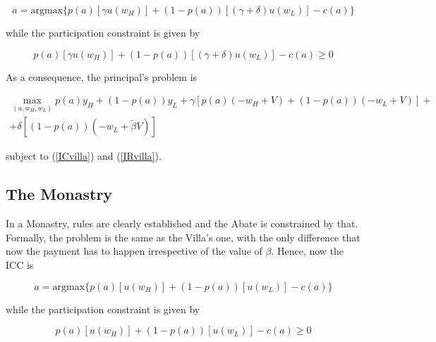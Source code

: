 \documentclass[12pt,a4paper]{article}
\begin{document}
\begin{equation}\label{ICvilla}
a= \text{argmax} \lbrace p\left(a \right)\left[\gamma u \left( w_{H}\right)\right]+\left( 1-p\left( a \right)\right)\left[\left(\gamma+\delta\right)u\left(w_{L}\right)\right]-c\left(a\right)   \rbrace
\end{equation}

while the participation constraint is given by

\begin{equation}\label{IRvilla}
p\left( a \right)\left[\gamma u\left(w_{H}\right)\right]+\left(1-p\left( a \right)\right)\left[\left(\gamma+\delta\right)u\left(w_{L}\right)\right]-c\left(a\right) \geq 0  
\end{equation}

As a consequence, the principal's problem is

\begin{multline}\label{PrincipalVilla}
\max_{\left(a, w_{H}, w_{L}\right)} p\left(a\right)y_{H} + \left(1-p\left(a\right)\right)y_{L}+\gamma\left[p\left(a\right)\left(-w_{H}+V\right)+\left(1-p\left(a\right)\right)\left(-w_{L}+V\right)\right]+ \\ +\delta\left[\left(1-p\left(a\right)\right)\left(-w_{L}+\tilde{\beta}V\right)\right]
\end{multline}

subject to (\ref{ICvilla}) and (\ref{IRvilla}).

\subsection{The Monastry}
In a Monastry, rules are clearly established and the Abate is constrained by that. Formally, the problem is the same as the Villa's one, with the only difference that now the payment has to happen irrespective of the value of $\beta$.
Hence, now the ICC is

\begin{equation}\label{ICmonks}
a= \text{argmax} \lbrace p\left(a \right)\left[ u \left( w_{H}\right)\right]+\left( 1-p\left( a \right)\right)\left[u\left(w_{L}\right)\right]-c\left(a\right)   \rbrace
\end{equation}


while the participation constraint is given by

\begin{equation}\label{IRmonks}
p\left( a \right)\left[u\left(w_{H}\right)\right]+\left(1-p\left( a \right)\right)\left[u\left(w_{L}\right)\right]-c\left(a\right) \geq 0  
\end{equation}
\end{document}
